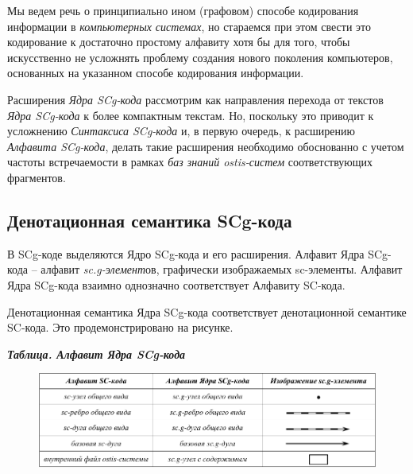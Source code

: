 Мы ведем речь о принципиально ином (графовом) способе кодирования информации в \textit{компьютерных системах}, но стараемся при этом свести это кодирование к достаточно простому алфавиту хотя бы для того, чтобы искусственно не усложнять проблему создания нового поколения компьютеров, основанных на указанном способе кодирования информации. 

Расширения \textit{Ядра SCg-кода} рассмотрим как направления перехода от текстов \textit{Ядра SCg-кода} к более компактным текстам. Но, поскольку это приводит к усложнению \textit{Синтаксиса SCg-кода} и, в первую очередь, к расширению \textit{Алфавита SCg-кода}, делать такие расширения необходимо обоснованно с учетом частоты встречаемости в рамках \textit{баз знаний ostis-систем} соответствующих фрагментов.


\subsection{Денотационная семантика SCg-кода}


В SCg-коде выделяются Ядро SCg-кода и его расширения. 
Алфавит Ядра SCg-кода -- алфавит  \textit{sc.g-элемент}ов, графически изображаемых sc-элементы. Алфавит Ядра SCg-кода взаимно однозначно соответствует Алфавиту SC-кода.

Денотационная семантика Ядра SCg-кода соответствует денотационной семантике SC-кода. Это продемонстрировано на рисунке.

\textbf{\textit{Таблица. Алфавит Ядра SCg-кода}}
\begin{figure}[h]
	\centering
	\includegraphics[scale=0.8]{images/intro/scg/SCg-core-alphabet.pdf}
\end{figure}


